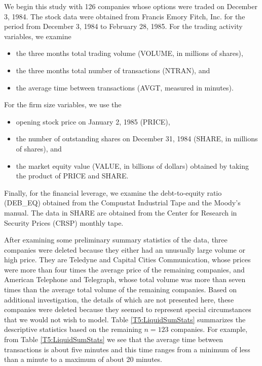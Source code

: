 We begin this study with 126 companies whose options were traded on December
3, 1984. The stock data were obtained from Francis Emory Fitch, Inc. for the
period from December 3, 1984 to February 28, 1985. For the trading activity
variables, we examine
\begin{itemize}
\item the three months total trading volume (VOLUME, in millions of shares),
\item the three months total number of transactions (NTRAN), and
\item the average time between transactions (AVGT, measured in minutes).
\end{itemize}
\noindent For the firm size variables, we use the
\begin{itemize}
\item opening stock price on January 2, 1985 (PRICE),
\item  the number of outstanding shares on December 31, 1984 (SHARE, in millions of shares), and
\item  the market equity value (VALUE, in billions of dollars) obtained by taking the product of PRICE and SHARE.
\end{itemize}
\noindent Finally, for the financial leverage, we examine the
debt-to-equity ratio (DEB\_EQ) obtained from the Compustat
Industrial Tape and the Moody's manual. The data in SHARE are
obtained from the Center for Research in Security Prices (CRSP)
monthly tape.

After examining some preliminary summary statistics of the data,
three companies were deleted because they either had an unusually
large volume or high price. They are Teledyne and Capital Cities
Communication, whose prices were more than four times the average
price of the remaining companies, and American Telephone and
Telegraph, whose total volume was more than seven times than the
average total volume of the remaining companies. Based on additional
investigation, the details of which are not presented here, these
companies were deleted because they seemed to represent special
circumstances that we would not wish to model. Table
\ref{T5:LiquidSumStats} summarizes the descriptive statistics based
on the remaining $n=123$ companies. For example, from Table
\ref{T5:LiquidSumStats} we see that the average time between
transactions is about five minutes and this time ranges from a
minimum of less than a minute to a maximum of about 20 minutes.

